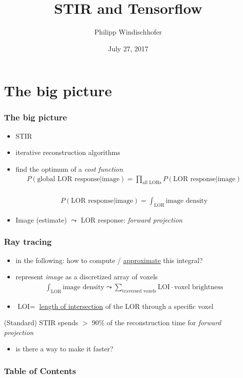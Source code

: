 \documentclass{beamer}
\title{STIR and Tensorflow}
\author{Philipp Windischhofer}
\date{July 27, 2017}
\begin{document}
 
\frame{\titlepage}

\section{The big picture}
\begin{frame}
  \frametitle{The big picture}
  \begin{itemize}
  \item STIR
    \pause
  \item iterative reconstruction algorithms
  \item find the optimum of a \textsl{cost function}\\
    \pause
    \begin{align*} P(\text{global LOR response} | \text{image}) = \prod_{\text{all LORs}} P(\text{LOR response} | \text{image})\end{align*}\\
    \begin{align*} P(\text{LOR response} | \text{image}) = \int_{\text{LOR}} \text{image density}\end{align*}
  \item Image (estimate) $\leadsto$ LOR response: \textsl{forward projection}
  \end{itemize}
\end{frame}

\begin{frame}
  \frametitle{Ray tracing}
  \begin{itemize}
    \item in the following: how to compute / \underline{approximate} this integral?
    \item represent \textsl{image} as a discretized array of voxels
    \begin{align*}\int_{\text{LOR}} \text{image density} \leadsto \sum_{\text{traversed voxels}} \text{LOI} \cdot \text{voxel brightness}\end{align*}
    \item $\text{LOI} = $ \underline{length of intersection} of the LOR through a specific voxel
  \end{itemize}
  (Standard) STIR spends $>$ 90\% of the reconstruction time for \textsl{forward projection}
  \begin{itemize}
    \item is there a way to make it faster?
  \end{itemize}
\end{frame}

\begin{frame}
\frametitle{Table of Contents}
\tableofcontents
\end{frame}
\end{document}
